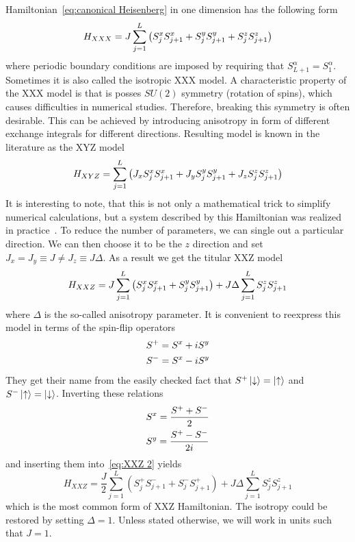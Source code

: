 Hamiltonian~\eqref{eq:canonical Heisenberg} in one dimension has the following form
\begin{equation}
    H_{XXX} =  J\sum_{j=1}^L \left( S^{x}_{j}S^{x}_{j+1} + S^{y}_{j}S^{y}_{j+1} + S^{z}_{j}S^{z}_{j+1} \right)
    \label{eq:XXX}
\end{equation}
where periodic boundary conditions are imposed by requiring that \(S^{\alpha}_{L+1} = 
S^{\alpha}_{1}\). 
Sometimes it is also called the isotropic XXX model. A characteristic property of the XXX model
is that is posses \(SU(2)\) symmetry (rotation of spins), which causes
difficulties in numerical studies. Therefore, breaking this symmetry is often desirable.
This can be achieved by introducing anisotropy in form of different exchange integrals for
different directions. Resulting model is known in the literature as the XYZ model
\begin{equation}
    H_{XYZ} = \sum_{j=1}^L  \left( J_{x} S^{x}_{j}S^{x}_{j+1} + J_{y} 
    S^{y}_{j}S^{y}_{j+1} + J_{z} S^{z}_{j}S^{z}_{j+1} \right)
\label{eq:XYZ}
\end{equation}
It is interesting to note, that this is not only a mathematical trick
to simplify numerical calculations, but a system described by this Hamiltonian was realized in
practice~\autocite{Pinheiro2013}.
To reduce the number of parameters, we can single out a particular direction.
We can then choose it to be the \(z\) direction
and set \(J_x = J_y \equiv J \neq J_z \equiv J\Delta\). As a result we get the titular XXZ model
\begin{equation}
    H_{XXZ} = J\sum_{j=1}^L  \left( S^{x}_{j}S^{x}_{j+1} + S^{y}_{j}S^{y}_{j+1} \right) + 
    J\Delta \sum_{j=1}^L S^{z}_{j}S^{z}_{j+1}
\label{eq:XXZ 2}
\end{equation}
where \(\Delta\) is the so-called anisotropy parameter.
It is convenient to reexpress this model in terms of the spin-flip operators
\begin{align}
    &S^{+} = S^{x} + iS^{y}\\
    &S^{-} = S^{x} - iS^{y}
\end{align}
They get their name from the easily checked fact that \(S^{+}\ket{\downarrow} = \ket{\uparrow}\) and 
\(S^{-}\ket{\uparrow} = \ket{\downarrow}\). Inverting these relations
\begin{align}
    &S^{x} = \frac{S^{+} + S^{-}}{2}\\
    &S^{y} = \frac{S^{+} - S^{-}}{2i}
\end{align}
and inserting them into~\eqref{eq:XXZ 2} yields
\begin{equation}
    H_{XXZ} = \frac{J}{2}\sum_{j = 1}^{L}\left( S^{+}_{j} S^{-}_{j+1} + 
    S^{-}_{j}S^{+}_{j+1} \right) + J\Delta\sum_{j = 1}^{L} S^{z}_{j}S^{z}_{j+1}
    \label{eq:XXZ}
\end{equation}
which is the most common form of XXZ Hamiltonian. The isotropy could be restored
by setting \(\Delta = 1\). Unless stated otherwise, we will work in units such that \(J = 1\).


